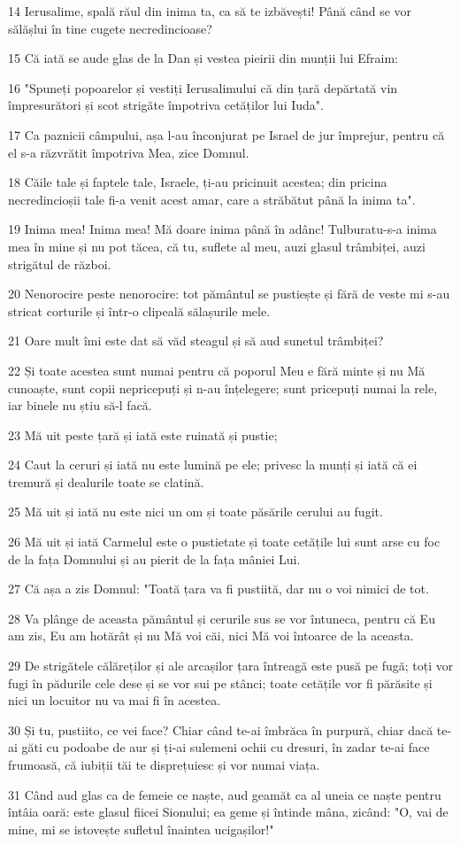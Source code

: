 \par 14 Ierusalime, spală răul din inima ta, ca să te izbăvești! Până când se vor sălășlui în tine cugete necredincioase?
\par 15 Că iată se aude glas de la Dan și vestea pieirii din munții lui Efraim:
\par 16 "Spuneți popoarelor și vestiți Ierusalimului că din țară depărtată vin împresurători și scot strigăte împotriva cetăților lui Iuda".
\par 17 Ca paznicii câmpului, așa l-au înconjurat pe Israel de jur împrejur, pentru că el s-a răzvrătit împotriva Mea, zice Domnul.
\par 18 Căile tale și faptele tale, Israele, ți-au pricinuit acestea; din pricina necredincioșii tale fi-a venit acest amar, care a străbătut până la inima ta".
\par 19 Inima mea! Inima mea! Mă doare inima până în adânc! Tulburatu-s-a inima mea în mine și nu pot tăcea, că tu, suflete al meu, auzi glasul trâmbiței, auzi strigătul de război.
\par 20 Nenorocire peste nenorocire: tot pământul se pustiește și fără de veste mi s-au stricat corturile și într-o clipeală sălașurile mele.
\par 21 Oare mult îmi este dat să văd steagul și să aud sunetul trâmbiței?
\par 22 Și toate acestea sunt numai pentru că poporul Meu e fără minte și nu Mă cunoaște, sunt copii nepricepuți și n-au înțelegere; sunt pricepuți numai la rele, iar binele nu știu să-l facă.
\par 23 Mă uit peste țară și iată este ruinată și pustie;
\par 24 Caut la ceruri și iată nu este lumină pe ele; privesc la munți și iată că ei tremură și dealurile toate se clatină.
\par 25 Mă uit și iată nu este nici un om și toate păsările cerului au fugit.
\par 26 Mă uit și iată Carmelul este o pustietate și toate cetățile lui sunt arse cu foc de la fața Domnului și au pierit de la fața mâniei Lui.
\par 27 Că așa a zis Domnul: "Toată țara va fi pustiită, dar nu o voi nimici de tot.
\par 28 Va plânge de aceasta pământul și cerurile sus se vor întuneca, pentru că Eu am zis, Eu am hotărât și nu Mă voi căi, nici Mă voi întoarce de la aceasta.
\par 29 De strigătele călăreților și ale arcașilor țara întreagă este pusă pe fugă; toți vor fugi în pădurile cele dese și se vor sui pe stânci; toate cetățile vor fi părăsite și nici un locuitor nu va mai fi în acestea.
\par 30 Și tu, pustiito, ce vei face? Chiar când te-ai îmbrăca în purpură, chiar dacă te-ai găti cu podoabe de aur și ți-ai sulemeni ochii cu dresuri, în zadar te-ai face frumoasă, că iubiții tăi te disprețuiesc și vor numai viața.
\par 31 Când aud glas ca de femeie ce naște, aud geamăt ca al uneia ce naște pentru întâia oară: este glasul fiicei Sionului; ea geme și întinde mâna, zicând: "O, vai de mine, mi se istovește sufletul înaintea ucigașilor!"

